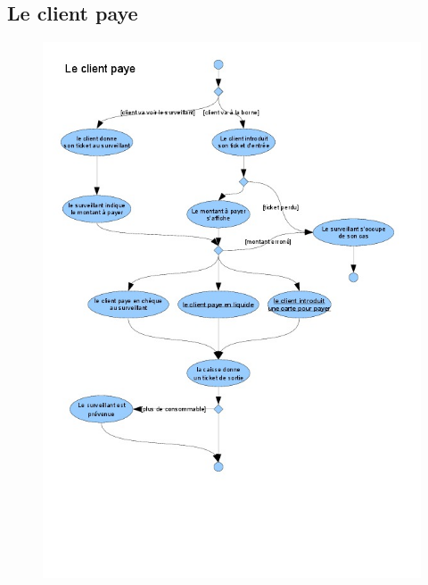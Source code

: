 \documentclass[a4paper]{article}
\begin{document}
\subsection{Le client paye}
\begin{figure}[!ht]
\centering
\includegraphics[scale=.5]{imgs/act_paye.jpg}
\end{figure}
\newpage
\end{document}
